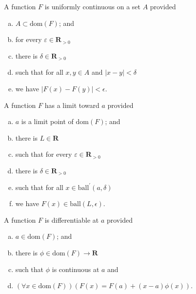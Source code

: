 \documentclass[letterpaper,landscape,9pt,fleqn]{extarticle}
\newcommand{\dom}{\mathrm{dom}}
\newcommand{\reals}{\mathbf{R}}
\newcommand{\ball}{\mathrm{ball}}
\newenvironment{alphalist}{
  \begin{enumerate}[(a)]
    \addtolength{\itemsep}{-1.0\itemsep}}
  {\end{enumerate}}
\begin{document}
\begin{multicols*}{3}
\begin{description}[\itemsep=0em]
    \item[Uniformly continuous]  A function $F$ is uniformly continuous on a set $A$ provided 
       \begin{alphalist}
          \item $A \subset \dom(F)$; and
          \item for every $\varepsilon \in \reals_{>0}$
          \item there is $\delta \in \reals_{>0}$
          \item such that for all $x,y  \in A$ and $ |x-y| < \delta$
          \item we have $|F(x) - F(y)| < \epsilon$.
       \end{alphalist} 
    \item[Limit]  A function $F$ has a limit toward $a$ provided
       \begin{alphalist}
          \item $a$ is a limit point of $\dom(F)$; and
          \item there is $L \in \reals$
          \item such that for every $\varepsilon \in \reals_{>0}$
          \item there is $\delta \in \reals_{>0}$
          \item such that for all $x \in \ball^\prime(a,\delta)$
          \item we have $F(x) \in \ball(L, \epsilon)$.
       \end{alphalist} 

    \item[Differentiable] A function $F$ is differentiable at $a$ provided
     \begin{alphalist}
    \item $a \in \dom(F)$; and
       \item there is $\phi \in \dom(F) \to \reals$
       \item such that $\phi$ is continuous at $a$ and
       \item $(\forall x \in \dom(F))(F(x) = F(a) + (x-a) \phi(x))$.
     \end{alphalist}
\end{description}


\end{multicols*}
\end{document}
